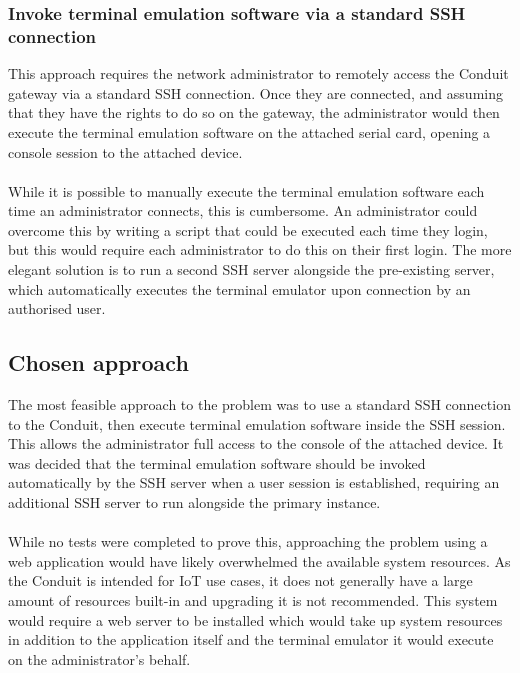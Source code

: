 \subsubsection{Invoke terminal emulation software via a standard SSH connection}
This approach requires the network administrator to remotely access the Conduit gateway via a standard SSH connection. Once they are connected, and assuming that they have the rights to do so on the gateway, the administrator would then execute the terminal emulation software on the attached serial card, opening a console session to the attached device.\\\\
While it is possible to manually execute the terminal emulation software each time an administrator connects, this is cumbersome. An administrator could overcome this by writing a script that could be executed each time they login, but this would require each administrator to do this on their first login. The more elegant solution is to run a second SSH server alongside the pre-existing server, which automatically executes the terminal emulator upon connection by an authorised user.

\subsection{Chosen approach}
\label{subsection:design-methodology-approach}
The most feasible approach to the problem was to use a standard SSH connection to the Conduit, then execute terminal emulation software inside the SSH session. This allows the administrator full access to the console of the attached device. It was decided that the terminal emulation software should be invoked automatically by the SSH server when a user session is established, requiring an additional SSH server to run alongside the primary instance. \\\\
While no tests were completed to prove this, approaching the problem using a web application would have likely overwhelmed the available system resources. As the Conduit is intended for IoT use cases, it does not generally have a large amount of resources built-in and upgrading it is not recommended. This system would require a web server to be installed which would take up system resources in addition to the application itself and the terminal emulator it would execute on the administrator's behalf.

